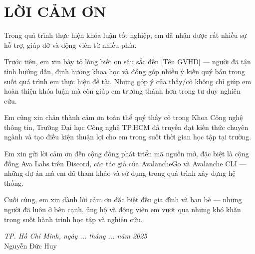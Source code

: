 \chapter*{LỜI CẢM ƠN}

Trong quá trình thực hiện khóa luận tốt nghiệp, em đã nhận được rất nhiều sự hỗ trợ, giúp đỡ và động viên từ nhiều phía.

Trước tiên, em xin bày tỏ lòng biết ơn sâu sắc đến [Tên GVHD] --- người đã tận tình hướng dẫn, định hướng khoa học và đóng góp nhiều ý kiến quý báu trong suốt quá trình em thực hiện đề tài. Những góp ý của thầy/cô không chỉ giúp em hoàn thiện khóa luận mà còn giúp em trưởng thành hơn trong tư duy nghiên cứu.

Em cũng xin chân thành cảm ơn toàn thể quý thầy cô trong Khoa Công nghệ thông tin, Trường Đại học Công nghệ TP.HCM đã truyền đạt kiến thức chuyên ngành và tạo điều kiện thuận lợi cho em trong suốt thời gian học tập tại trường.

Em xin gửi lời cảm ơn đến cộng đồng phát triển mã nguồn mở, đặc biệt là cộng đồng Ava Labs trên Discord, các tác giả của AvalancheGo và Avalanche CLI --- những dự án mà em đã tham khảo và sử dụng trong quá trình xây dựng hệ thống.

Cuối cùng, em xin dành lời cảm ơn đặc biệt đến gia đình và bạn bè --- những người đã luôn ở bên cạnh, ủng hộ và động viên em vượt qua những khó khăn trong suốt hành trình học tập và nghiên cứu.

\vspace{1cm}
\begin{flushright}
\textit{TP. Hồ Chí Minh, ngày ... tháng ... năm 2025}\\
\vspace{1cm}
Nguyễn Đức Huy
\end{flushright}
